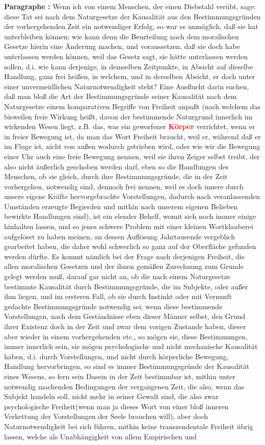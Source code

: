 \documentclass[a4paper,12pt,twoside]{book}
\newcommand{\match}[1]{\textcolor{red}{\textbf{#1}}}
\begin{document}
	\noindent\textbf{Paragraphe : }Wenn ich von einem Menschen, der einen Diebstahl verübt, sage: diese Tat sei nach dem Naturgesetze der Kausalität aus den Bestimmungsgründen der vorhergehenden Zeit ein notwendiger Erfolg, so war es unmöglich, daß sie hat unterbleiben können; wie kann denn die Beurteilung nach dem moralischen Gesetze hierin eine Änderung machen, und voraussetzen, daß sie doch habe unterlassen werden können, weil das Gesetz sagt, sie hätte unterlassen werden sollen, d.i. wie kann derjenige, in demselben Zeitpunkte, in Absicht auf dieselbe Handlung, ganz frei heißen, in welchem, und in  derselben Absicht, er doch unter einer unvermeidlichen Naturnotwendigkeit steht? Eine Ausflucht darin suchen, daß man bloß die Art der Bestimmungsgründe seiner Kausalität nach dem Naturgesetze einem komparativen Begriffe von Freiheit anpaßt (nach welchem das bisweilen freie Wirkung heißt, davon der bestimmende Naturgrund innerlich im wirkenden Wesen liegt, z.B. das, was ein geworfener \match{Körper} verrichtet, wenn er in freier Bewegung ist, da man das Wort Freiheit braucht, weil er, während daß er im Fluge ist, nicht von außen wodurch getrieben wird, oder wie wir die Bewegung einer Uhr auch eine freie Bewegung nennen, weil sie ihren Zeiger selbst treibt, der also nicht äußerlich geschoben werden darf, eben so die Handlungen des Menschen, ob sie gleich, durch ihre Bestimmungsgründe, die in der Zeit vorhergehen, notwendig sind, dennoch frei nennen, weil es doch innere durch unsere eigene Kräfte hervorgebrachte Vorstellungen, dadurch nach veranlassenden Umständen erzeugte Begierden und mithin nach unserem eigenen Belieben bewirkte Handlungen sind), ist ein elender Behelf, womit sich noch immer einige hinhalten lassen, und so jenes schwere Problem mit einer kleinen Wortklauberei aufgelöset zu haben meinen, an dessen Auflösung Jahrtausende vergeblich gearbeitet haben, die daher wohl schwerlich so ganz auf der Oberfläche gefunden werden dürfte. Es kommt nämlich bei der Frage nach derjenigen Freiheit, die allen moralischen Gesetzen und der ihnen gemäßen Zurechnung zum Grunde gelegt werden muß, darauf gar nicht an, ob die nach einem Naturgesetze bestimmte Kausalität durch Bestimmungsgründe, die im Subjekte, oder außer ihm liegen, und im ersteren Fall, ob sie durch Instinkt oder mit Vernunft gedachte Bestimmungsgründe notwendig sei; wenn diese bestimmende Vorstellungen, nach dem Geständnisse eben dieser Männer selbst, den Grund ihrer Existenz doch in der Zeit und zwar dem vorigen Zustande haben, dieser aber wieder in einem vorhergehenden etc., so mögen sie, diese Bestimmungen, immer innerlich sein, sie mögen psychologische und nicht mechanische Kausalität haben, d.i. durch Vorstellungen, und nicht durch körperliche Bewegung,  Handlung hervorbringen, so sind es immer Bestimmungsgründe der Kausalität eines Wesens, so fern sein Dasein in der Zeit bestimmbar ist, mithin unter notwendig machenden Bedingungen der vergangenen Zeit, die also, wenn das Subjekt handeln soll, nicht mehr in seiner Gewalt sind, die also zwar psychologische Freiheit(wenn man ja dieses Wort von einer bloß inneren Verkettung der Vorstellungen der Seele brauchen will), aber doch Naturnotwendigkeit bei sich führen, mithin keine transzendentale Freiheit übrig lassen, welche als Unabhängigkeit von allem Empirischen und 
\end{document}
